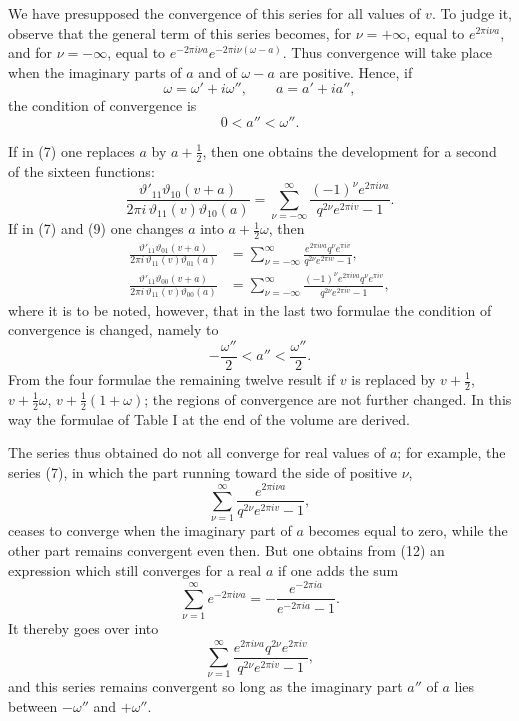\documentclass[11pt]{article}
\newcommand{\tht}{\vartheta}
\begin{document}
We have presupposed the convergence of this series for all values of $v$. To judge it, observe that the general term of this series becomes, for $\nu=+\infty$, equal to $e^{2\pi i\nu a}$, and for $\nu=-\infty$, equal to $e^{-2\pi i\nu a}e^{-2\pi i\nu(\omega-a)}$. Thus convergence will take place when the imaginary parts of $a$ and of $\omega-a$ are positive. Hence, if
\[
\omega=\omega'+i\omega'',\qquad a=a'+ia'',
\]
the condition of convergence is
\begin{equation}
0<a''<\omega''.
\tag{8}
\end{equation}

If in (7) one replaces $a$ by $a+\frac12$, then one obtains the development for a second of the sixteen functions:
\begin{equation}
\frac{\tht'_{11}\tht_{10}(v+a)}{2\pi i\,\tht_{11}(v)\tht_{10}(a)}
=\sum_{\nu=-\infty}^{\infty}\frac{(-1)^\nu e^{2\pi i\nu a}}{q^{2\nu}e^{2\pi iv}-1}.
\tag{9}
\end{equation}
If in (7) and (9) one changes $a$ into $a+\frac12\omega$, then
\begin{align}
\frac{\tht'_{11}\tht_{01}(v+a)}{2\pi i\,\tht_{11}(v)\tht_{01}(a)}
&=\sum_{\nu=-\infty}^{\infty}\frac{e^{2\pi i\nu a}q^\nu e^{\pi iv}}{q^{2\nu}e^{2\pi iv}-1}, \tag{10}\\
\frac{\tht'_{11}\tht_{00}(v+a)}{2\pi i\,\tht_{11}(v)\tht_{00}(a)}
&=\sum_{\nu=-\infty}^{\infty}\frac{(-1)^\nu e^{2\pi i\nu a}q^\nu e^{\pi iv}}{q^{2\nu}e^{2\pi iv}-1}, \tag{11}
\end{align}
where it is to be noted, however, that in the last two formulae the condition of convergence is changed, namely to
\[
-\frac{\omega''}{2}<a''<\frac{\omega''}{2}.
\]
From the four formulae the remaining twelve result if $v$ is replaced by $v+\frac12$, $v+\frac12\omega$, $v+\frac12(1+\omega)$; the regions of convergence are not further changed. In this way the formulae of Table I at the end of the volume are derived.

The series thus obtained do not all converge for real values of $a$; for example, the series (7), in which the part running toward the side of positive $\nu$,
\begin{equation}
\sum_{\nu=1}^{\infty}\frac{e^{2\pi i\nu a}}{q^{2\nu}e^{2\pi iv}-1},
\tag{12}
\end{equation}
ceases to converge when the imaginary part of $a$ becomes equal to zero, while the other part remains convergent even then. But one obtains from (12) an expression which still converges for a real $a$ if one adds the sum
\begin{equation}
\sum_{\nu=1}^{\infty}e^{-2\pi i\nu a}=-\frac{e^{-2\pi ia}}{e^{-2\pi ia}-1}.
\tag{13}
\end{equation}
It thereby goes over into
\[
\sum_{\nu=1}^{\infty}\frac{e^{2\pi i\nu a}q^{2\nu}e^{2\pi iv}}{q^{2\nu}e^{2\pi iv}-1},
\]
and this series remains convergent so long as the imaginary part $a''$ of $a$ lies between $-\omega''$ and $+\omega''$.
\end{document}
